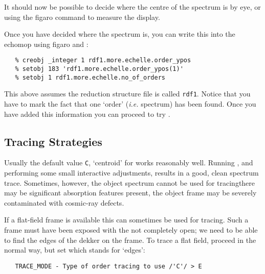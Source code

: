 {{It should now be possible to decide where the centre of the spectrum is
by eye, or using the {\sc figaro} command 
to measure the display.

Once you have decided where the spectrum is, you can write this into the
{\sc echomop}
 using {\sc figaro}
 and
:

{
\scspec{\small}{ }
\begin{verbatim}
   % creobj _integer 1 rdf1.more.echelle.order_ypos
   % setobj 183 'rdf1.more.echelle.order_ypos(1)'
   % setobj 1 rdf1.more.echelle.no_of_orders
\end{verbatim}
}

This above assumes the reduction structure file is called \verb+rdf1+\@.
Notice that you have to mark the fact that one `order' ({\it{i.e.}} spectrum)
has been found.  Once you have added this information you can proceed to
try \@.


\subsection{Tracing Strategies}

Usually the default value \verb+C+, `centroid' for  works reasonably well.
Running 
,
and performing some small interactive adjustments, results in a good,
clean spectrum trace.  Sometimes, however, the object spectrum cannot
be used for tracing\scspec{---}{ - }there may be significant absorption
features present, the object frame may be severely contaminated with
cosmic-ray defects.

If a flat-field frame is available this can sometimes be used for tracing.
Such a frame must have been exposed with the 
not completely open;
we need to be able to find the edges of the dekker on the frame.
To trace a flat field, proceed in the normal way, but set  which stands for `edges':

{
\scspec{\small}{ }
\begin{verbatim}
   TRACE_MODE - Type of order tracing to use /'C'/ > E
\end{verbatim}
}

}}
